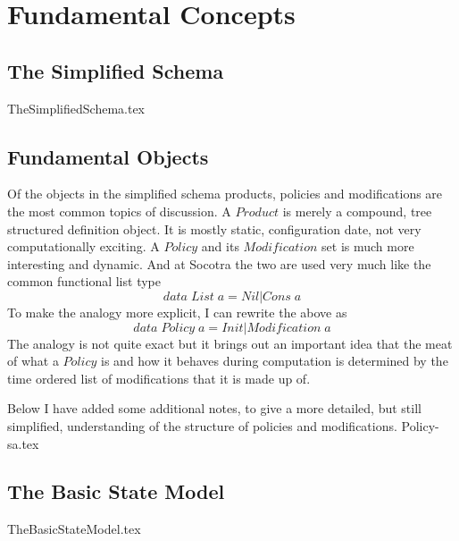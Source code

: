 %
%
%
\chapter{Fundamental Concepts}
\label{intro} %


\section{The Simplified Schema}
\label{sec:01:1}
{TheSimplifiedSchema.tex}

\section{Fundamental Objects}
Of the objects in the simplified schema products, policies and modifications are the most common topics
of discussion. A $Product$ is merely a compound, tree structured definition object. It is mostly static,
configuration date, not very computationally exciting. A $Policy$ and its $Modification$ set is much more
interesting and dynamic. And at Socotra the two are used very much like the common functional list type
\begin{equation*}
  data \; List \; a = Nil | Cons \; a
\end{equation*}
To make the analogy more explicit, I can rewrite the above as
\begin{equation*}
  data \; Policy \; a = Init | Modification  \; a
\end{equation*}
The analogy is not quite exact but it brings out an important idea that the meat of what a $Policy$ is and
how it behaves during computation is determined by the time ordered list of modifications that it is made up
of.

Below I have added some additional notes, to give a more detailed, but still simplified, understanding of
the structure of policies and modifications.
\label{sec:01:2}
{Policy-sa.tex}

\section{The Basic State Model}
\label{sec:01:3}
{TheBasicStateModel.tex}



